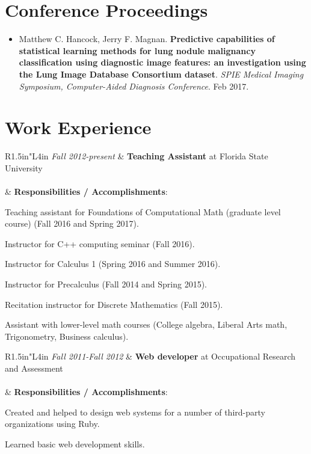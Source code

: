 \documentclass[a4paper,10pt]{report}
\begin{document}
\section{Conference Proceedings}

\begin{itemize}
    \item Matthew C. Hancock, Jerry F. Magnan. \textbf{Predictive capabilities of statistical learning methods for lung nodule malignancy classification using diagnostic image features: an investigation using the Lung Image Database Consortium dataset}. \textit{SPIE Medical Imaging Symposium, Computer-Aided Diagnosis Conference}. Feb 2017.\end{itemize}


\section{Work Experience}

\begin{tabular}{R{1.5in}"L{4in}}
    \emph{Fall 2012-present} & \textbf{Teaching Assistant} at Florida State University \\
\\[4pt] & \textbf{Responsibilities / Accomplishments}:
        \begin{itemize}
        \setlength\itemsep{0pt}
        {\small
            \item Teaching assistant for Foundations of Computational Math (graduate level course) (Fall 2016 and Spring 2017).
            \item Instructor for C++ computing seminar (Fall 2016).
            \item Instructor for Calculus 1 (Spring 2016 and Summer 2016).
            \item Instructor for Precalculus (Fall 2014 and Spring 2015).
            \item Recitation instructor for Discrete Mathematics (Fall 2015).
            \item Assistant with lower-level math courses (College algebra, Liberal Arts math, Trigonometry, Business calculus).
        }
        \end{itemize}
\end{tabular}

\vspace{.15in}
\begin{tabular}{R{1.5in}"L{4in}}
    \emph{Fall 2011-Fall 2012} & \textbf{Web developer} at Occupational Research and Assessment \\
\\[4pt] & \textbf{Responsibilities / Accomplishments}:
        \begin{itemize}
        \setlength\itemsep{0pt}
        {\small
            \item Created and helped to design web systems for a number of third-party organizations using Ruby.
            \item Learned basic web development skills.
        }
        \end{itemize}
\end{tabular}
\end{document}
